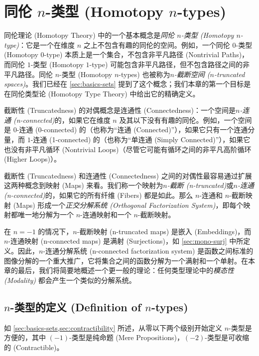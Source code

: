 \chapter{同伦 $n$-类型 (Homotopy \texorpdfstring{$n$}{n}-types)}
\label{cha:hlevels}

%

同伦理论 (Homotopy Theory) 中的一个基本概念是\emph{同伦 $n$-类型 (Homotopy $n$-type)}：它是一个在维度 $n$ 之上不包含有趣的同伦的空间。例如，一个同伦 $0$-类型 (Homotopy $0$-type) 本质上是一个集合，不包含非平凡路径 (Nontrivial Paths)，而同伦 $1$-类型 (Homotopy $1$-type) 可能包含非平凡路径，但不包含路径之间的非平凡路径。同伦 $n$-类型 (Homotopy $n$-types) 也被称为\emph{$n$-截断空间 ($n$-truncated spaces)}。我们已经在 \cref{sec:basics-sets} 提到了这个概念；我们本章的第一个目标是在同伦类型论 (Homotopy Type Theory) 中给出它的精确定义。

截断性 (Truncatedness) 的对偶概念是连通性 (Connectedness)：一个空间是\emph{$n$-连通 (n-connected)}的，如果它在维度 $n$ 及其以下没有有趣的同伦。例如，一个空间是 $0$-连通 (0-connected) 的（也称为``连通 (Connected)''），如果它只有一个连通分量，而 $1$-连通 (1-connected) 的（也称为``单连通 (Simply Connected)''），如果它也没有非平凡循环 (Nontrivial Loops)（尽管它可能有循环之间的非平凡高阶循环 (Higher Loops)）。

截断性 (Truncatedness) 和连通性 (Connectedness) 之间的对偶性最容易通过扩展这两种概念到映射 (Maps) 来看。我们称一个映射为\emph{$n$-截断 (n-truncated)}或\emph{$n$-连通 (n-connected)}的，如果它的所有纤维 (Fibers) 都是如此。那么 $n$-连通和 $n$-截断映射 (Maps) 形成一个\emph{正交分解系统 (Orthogonal Factorization System)}，即每个映射都唯一地分解为一个 $n$-连通映射和一个 $n$-截断映射。

在 $n={-1}$ 的情况下，$n$-截断映射 (n-truncated maps) 是嵌入 (Embeddings)，而 $n$-连通映射 (n-connected maps) 是满射 (Surjections)，如 \cref{sec:mono-surj} 中所定义。因此，$n$-连通分解系统 (n-connected factorization system) 是函数之间标准的图像分解的一个重大推广，它将集合之间的函数分解为一个满射和一个单射。在本章的最后，我们将简要地概述一个更一般的理论：任何类型理论中的\emph{模态性 (Modality)} 都会产生一个类似的分解系统。

\section{$n$-类型的定义 (Definition of \texorpdfstring{$n$}{n}-types)}
\label{sec:n-types}

如 \cref{sec:basics-sets,sec:contractibility} 所述，从零以下两个级别开始定义 $n$-类型是方便的，其中 $(-1)$-类型是纯命题 (Mere Propositions)，$(-2)$-类型是可收缩的 (Contractible)。


